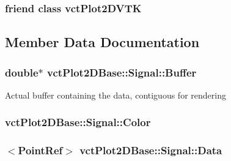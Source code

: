 \subsubsection[{vct\+Plot2\+D\+V\+T\+K}]{\setlength{\rightskip}{0pt plus 5cm}friend class vct\+Plot2\+D\+V\+T\+K\hspace{0.3cm}{\ttfamily [friend]}}\label{classvct_plot2_d_base_1_1_signal_a61e8f9a436596e1195d2b34b7b5c6f2e}


\subsection{Member Data Documentation}
\hypertarget{classvct_plot2_d_base_1_1_signal_a7b068b5ebd95f73ccafa04c5f7e10b28}{}
\subsubsection[{Buffer}]{\setlength{\rightskip}{0pt plus 5cm}double$\ast$ vct\+Plot2\+D\+Base\+::\+Signal\+::\+Buffer\hspace{0.3cm}{\ttfamily [protected]}}\label{classvct_plot2_d_base_1_1_signal_a7b068b5ebd95f73ccafa04c5f7e10b28}
Actual buffer containing the data, contiguous for rendering \hypertarget{classvct_plot2_d_base_1_1_signal_a8c99562aebf260551eaf9444b25d7cc9}{}
\subsubsection[{Color}]{ vct\+Plot2\+D\+Base\+::\+Signal\+::\+Color\hspace{0.3cm}{\ttfamily [protected]}}\label{classvct_plot2_d_base_1_1_signal_a8c99562aebf260551eaf9444b25d7cc9}
\hypertarget{classvct_plot2_d_base_1_1_signal_a67281dea46193aed681097745bb88c81}{}
\subsubsection[{Data}]{$<${\bf Point\+Ref}$>$ vct\+Plot2\+D\+Base\+::\+Signal\+::\+Data\hspace{0.3cm}{\ttfamily [protected]}}\label{classvct_plot2_d_base_1_1_signal_a67281dea46193aed681097745bb88c81}
\hypertarget{classvct_plot2_d_base_1_1_signal_a6cb2569f99ffcc9a3cf4c4be60c94810}{}
